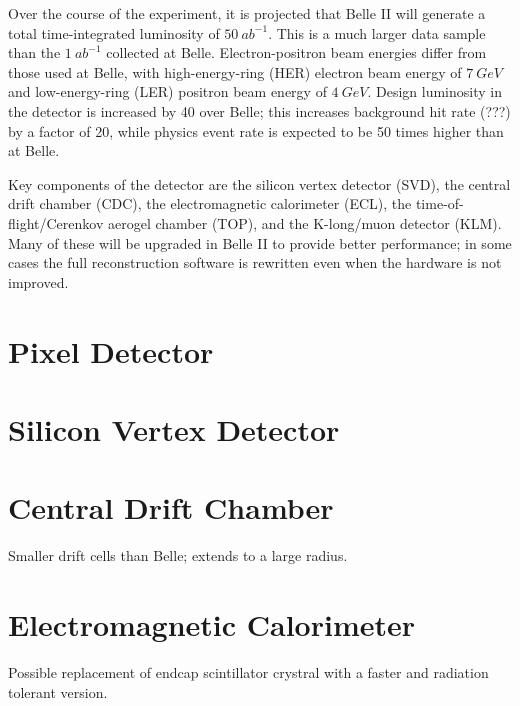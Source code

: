 \documentclass[12pt]{thesis}  %
\begin{document}
Over the course of the experiment, it is projected that Belle II will generate a total time-integrated luminosity of $\SI{50}{ab^{-1}}$. This is a much larger data sample than the $\SI{1}{ab^{-1}}$ collected at Belle. Electron-positron beam energies differ from those used at Belle, with high-energy-ring (HER) electron beam energy of $\SI{7}{GeV}$ and low-energy-ring (LER) positron beam energy  of $\SI{4}{GeV}$. Design luminosity in the detector is increased by 40 over Belle; this increases background hit rate (???) by a factor of 20, while physics event rate is expected to be 50 times higher than at Belle.

Key components of the detector are the silicon vertex detector (SVD), the central drift chamber (CDC), the electromagnetic calorimeter (ECL), the time-of-flight/Cerenkov aerogel chamber (TOP), and the K-long/muon detector (KLM). Many of these will be upgraded in Belle II to provide better performance; in some cases the full reconstruction software is rewritten even when the hardware is not improved.


\section{Pixel Detector}



\section{Silicon Vertex Detector}




\section{Central Drift Chamber}

Smaller drift cells than Belle; extends to a large radius.



\section{Electromagnetic Calorimeter}

Possible replacement of endcap scintillator crystral with a faster and radiation tolerant version.
\end{document}
